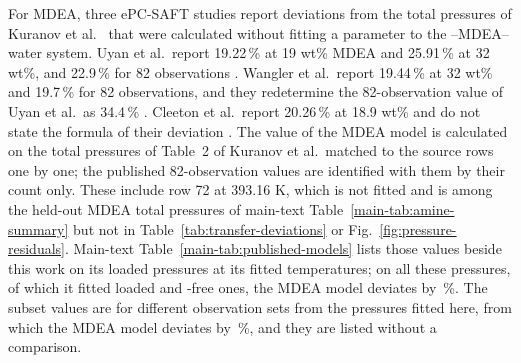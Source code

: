 \documentclass[a4paper,11pt]{article}
\begin{document}
For MDEA, three ePC-SAFT studies report deviations from the total pressures of Kuranov et al.\ \cite{kuranovSolubilitySingleGases1996} that were calculated without fitting a parameter to the \COtwo--MDEA--water system.
Uyan et al.\ report 19.22\,\% at 19 wt\% MDEA and 25.91\,\% at 32 wt\%, and 22.9\,\% for 82 observations \cite{Uyan2015}.
Wangler et al.\ report 19.44\,\% at 32 wt\% and 19.7\,\% for 82 observations, and they redetermine the 82-observation value of Uyan et al.\ as 34.4\,\% \cite{Wangler2018}.
Cleeton et al.\ report 20.26\,\% at 18.9 wt\% and do not state the formula of their deviation \cite{Cleeton2020}.
The value of the MDEA model is calculated on the  total pressures of Table~2 of Kuranov et al.\ matched to the source rows one by one; the published 82-observation values are identified with them by their count only.
These include row 72 at 393.16 K, which is not fitted and is among the held-out MDEA total pressures of main-text Table~\ref{main-tab:amine-summary} but not in Table~\ref{tab:transfer-deviations} or Fig.~\ref{fig:pressure-residuals}.
Main-text Table~\ref{main-tab:published-models} lists those values beside this work on its loaded pressures at its fitted temperatures; on all these pressures, of which it fitted  loaded and  \COtwo-free ones, the MDEA model deviates by \,\%.
The subset values are for different observation sets from the  pressures fitted here, from which the MDEA model deviates by \,\%, and they are listed without a comparison.



\end{document}
